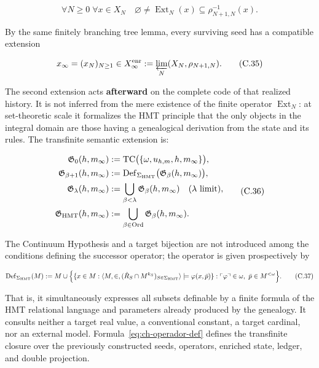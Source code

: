 \[
 \forall N\ge0\;\forall x\in X_N\quad
 \varnothing\ne\operatorname{Ext}_N(x)
 \subseteq\rho_{N+1,N}^{-1}(x).
\tag{C.34}\label{eq:ch-extension-no-vacia}
\]

By the same finitely branching tree lemma, every surviving seed has a
compatible extension

\[
 x_\infty=(x_N)_{N\ge1}\in
 X_\infty^{\rm enr}:=\varprojlim_N(X_N,\rho_{N+1,N}).
\tag{C.35}\label{eq:ch-limite-inverso}
\]

The second extension acts \textbf{afterward} on the complete code of that
realized history. It is not inferred from the mere existence of the finite
operator \(\operatorname{Ext}_N\): at set-theoretic scale it formalizes the
HMT principle that the only objects in the integral domain are those having a
genealogical derivation from the state and its rules. The transfinite semantic
extension is:

\[
 \begin{aligned}
  \mathfrak G_0(h,m_\infty)
  &:=\operatorname{TC}\bigl(\{\omega,u_{h,m},h,m_\infty\}\bigr),\\
  \mathfrak G_{\beta+1}(h,m_\infty)
  &:=\operatorname{Def}_{\Sigma_{\rm HMT}}
       \bigl(\mathfrak G_\beta(h,m_\infty)\bigr),\\
  \mathfrak G_\lambda(h,m_\infty)
  &:=\bigcup_{\beta<\lambda}\mathfrak G_\beta(h,m_\infty)
       \quad(\lambda\text{ limit}),\\
  \mathfrak G_{\rm HMT}(h,m_\infty)
  &:=\bigcup_{\beta\in\operatorname{Ord}}
       \mathfrak G_\beta(h,m_\infty).
 \end{aligned}
\tag{C.36}\label{eq:ch-clausura-transfinita}
\]

The Continuum Hypothesis and a target bijection are not introduced among the
conditions defining the successor operator; the operator is given
prospectively by

\[
 \operatorname{Def}_{\Sigma_{\rm HMT}}(M)
 :=M\cup
 \Bigl\{
   \{x\in M:\langle M,\in,
       (\dot R_S\cap M^{k_S})_{S\in\Sigma_{\rm HMT}}\rangle
       \models\varphi(x,\bar p)\}:
   \ulcorner\varphi\urcorner\in\omega,
   \ \bar p\in M^{<\omega}
 \Bigr\}.
\tag{C.37}\label{eq:ch-operador-def}
\]

That is, it simultaneously expresses all subsets definable by a finite formula
of the HMT relational language and parameters already produced by the
genealogy. It consults neither a target real value, a conventional constant, a
target cardinal, nor an external model. Formula~\eqref{eq:ch-operador-def}
defines the transfinite closure over the previously constructed seeds,
operators, enriched state, ledger, and double projection.

